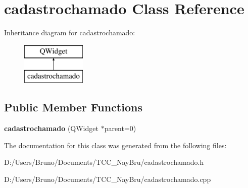 \section{cadastrochamado Class Reference}
\label{classcadastrochamado}
Inheritance diagram for cadastrochamado\+:\begin{figure}[H]
\begin{center}
\leavevmode
\includegraphics[height=2.000000cm]{classcadastrochamado}
\end{center}
\end{figure}
\subsection*{Public Member Functions}
\begin{DoxyCompactItemize}
\item 
{\bfseries cadastrochamado} (Q\+Widget $\ast$parent=0)\label{classcadastrochamado_a626bec1c5a76c3fe062f70f3fe857c3f}

\end{DoxyCompactItemize}


The documentation for this class was generated from the following files\+:\begin{DoxyCompactItemize}
\item 
D\+:/\+Users/\+Bruno/\+Documents/\+T\+C\+C\+\_\+\+Nay\+Bru/cadastrochamado.\+h\item 
D\+:/\+Users/\+Bruno/\+Documents/\+T\+C\+C\+\_\+\+Nay\+Bru/cadastrochamado.\+cpp\end{DoxyCompactItemize}

